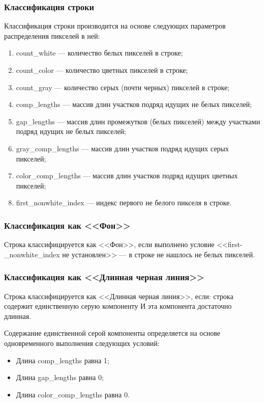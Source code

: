 \subsubsection*{Классификация строки}

Классификация строки производится на основе следующих параметров распределения пикселей в ней:
\begin{enumerate}
    \item count\_white --- количество белых пикселей в строке;
    \item count\_color --- количество цветных пикселей в строке;
    \item count\_gray --- количество серых (почти черных) пикселей в строке;
    \item comp\_lengths --- массив длин участков подряд идущих не белых пикселей;
    \item gap\_lengths --- массив длин промежутков (белых пикселей) между участками подряд идущих не белых пикселей;
    \item gray\_comp\_lengths --- массив длин участков подряд идущих серых пикселей;
    \item color\_comp\_lengths --- массив длин участков подряд идущих цветных пикселей;
    \item first\_nonwhite\_index --- индекс первого не белого пикселя в строке.
\end{enumerate}

\subsubsection*{Классификация как <<Фон>>}

Строка классифицируется как <<Фон>>, если выполнено условие <<first-\_nonwhite\_index не установлен>> --- в строке не нашлось не белых пикселей.

\subsubsection*{Классификация как <<Длинная черная линия>>}

Строка классифицируется как <<Длинная черная линия>>, если: строка содержит единственную серую компоненту И эта компонента достаточно длинная.

Содержание единственной серой компоненты определяется на основе одновременного выполнения следующих условий:
\begin{itemize}
    \item Длина comp\_lengths равна 1;
    \item Длина gap\_lengths равна 0;
    \item Длина color\_comp\_lengths равна 0.
\end{itemize}

